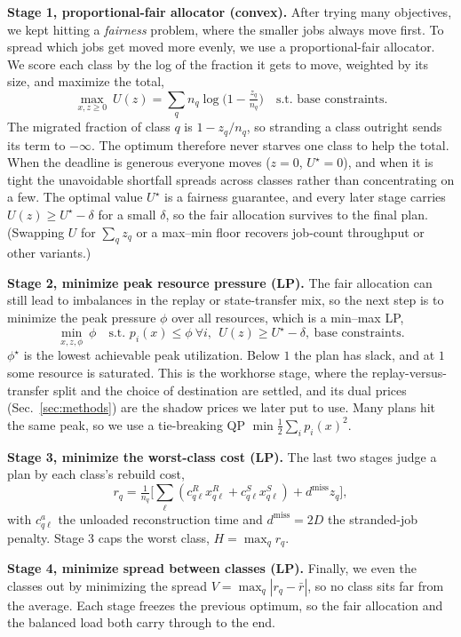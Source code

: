 \smallskip\noindent\textbf{Stage 1, proportional-fair allocator (convex).} After trying many objectives, we kept hitting a \emph{fairness} problem, where the smaller jobs always move first. To spread which jobs get moved more evenly, we use a proportional-fair allocator. We score each class by the log of the
fraction it gets to move, weighted by its size, and maximize the total,
\[
\max_{x,z\ge 0}\ U(z)=\sum_q n_q\log\!\Big(1-\tfrac{z_q}{n_q}\Big)
\quad\text{s.t. base constraints.}
\]
The migrated fraction of class $q$ is $1-z_q/n_q$, so stranding a class outright
sends its term to $-\infty$. The optimum therefore never starves one class to help
the total. When the deadline is generous everyone moves ($z=0$, $U^\star=0$), and
when it is tight the unavoidable shortfall spreads across classes rather than
concentrating on a few. The optimal value $U^\star$ is a fairness guarantee, and every
later stage carries $U(z)\ge U^\star-\delta$ for a small $\delta$, so the fair
allocation survives to the final plan. (Swapping $U$ for $\sum_q z_q$ or a max--min
floor recovers job-count throughput or other variants.)

\smallskip\noindent\textbf{Stage 2, minimize peak resource pressure (LP).} The fair
allocation can still lead to imbalances in the replay or state-transfer mix, so the next step is to minimize the peak pressure $\phi$ over all resources, which is a min--max LP,
\[
\min_{x,z,\phi}\ \phi \quad\text{s.t. }
p_i(x)\le\phi\ \forall i,\ \ U(z)\ge U^\star-\delta,\ \text{base constraints.}
\]
$\phi^\star$ is the lowest achievable peak utilization. Below $1$ the plan has
slack, and at $1$ some resource is saturated. This is the workhorse stage, where
the replay-versus-transfer split and the choice of destination are settled, and its dual prices
(Sec.~\ref{sec:methods}) are the shadow prices we later put to use. Many plans hit the
same peak, so we use a tie-breaking QP
$\min\tfrac12\sum_i p_i(x)^2$.

\smallskip\noindent\textbf{Stage 3, minimize the worst-class cost (LP).} The last
two stages judge a plan by each class's rebuild cost,
\[
r_q=\tfrac{1}{n_q}\big[\textstyle\sum_\ell(c^R_{q\ell}x^R_{q\ell}+c^S_{q\ell}x^S_{q\ell})+d^{\mathrm{miss}}z_q\big],
\]
with $c^a_{q\ell}$ the unloaded reconstruction time and $d^{\mathrm{miss}}\!=\!2D$
the stranded-job penalty. Stage 3 caps the worst class, $H=\max_q r_q$.

\smallskip\noindent\textbf{Stage 4, minimize spread between classes (LP).}
Finally, we even the classes out by minimizing the spread $V=\max_q|r_q-\bar r|$, so no
class sits far from the average. Each stage freezes the previous optimum, so the
fair allocation and the balanced load both carry through to the end.

